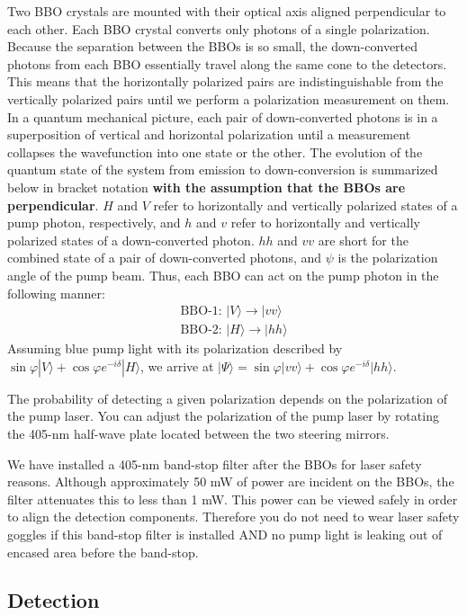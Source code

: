 \documentclass{../lab}
\begin{document}
Two BBO crystals are mounted with their optical axis aligned perpendicular to each other. Each BBO crystal converts only photons of a single polarization. Because the separation between the BBOs is so small, the down-converted photons from each BBO essentially travel along the same cone to the detectors. This means that the horizontally polarized pairs are indistinguishable from the vertically polarized pairs until we perform a polarization measurement on them. In a quantum mechanical picture, each pair of down-converted photons is in a superposition of vertical and horizontal polarization until a measurement collapses the wavefunction into one state or the other. The evolution of the quantum state of the system from emission to down-conversion is summarized below in bracket notation \textbf{with the assumption that the BBOs are perpendicular}. $H$ and $V$ refer to horizontally and vertically polarized states of a pump photon, respectively, and $h$ and $v$ refer to horizontally and vertically polarized states of a down-converted photon. $hh$ and $vv$ are short for the combined state of a pair of down-converted photons, and $\psi$ is the polarization angle of the pump beam. Thus, each BBO can act on the pump photon in the following manner:
\begin{gather*}
    \text{BBO-1: } |V\rangle \rightarrow  |vv\rangle \\
    \text{BBO-2: } |H\rangle \rightarrow  |hh\rangle 
\end{gather*}
Assuming blue pump light with its polarization described by $\sin \varphi |V\rangle + \cos\varphi e^{-i\delta} |H\rangle$, we arrive at $|\Psi\rangle = \sin\varphi |vv\rangle + \cos\varphi e^{-i\delta} |hh\rangle$.

The probability of detecting a given polarization depends on the polarization of the pump laser. You can adjust the polarization of the pump laser by rotating the 405-nm half-wave plate located between the two steering mirrors.

We have installed a 405-nm band-stop filter after the BBOs for laser safety reasons. Although approximately 50 mW of power are incident on the BBOs, the filter attenuates this to less than 1 mW. This power can be viewed safely in order to align the detection components. Therefore you do not need to wear laser safety goggles if this band-stop filter is installed AND no pump light is leaking out of encased area before the band-stop.

\subsection{Detection}
\end{document}
